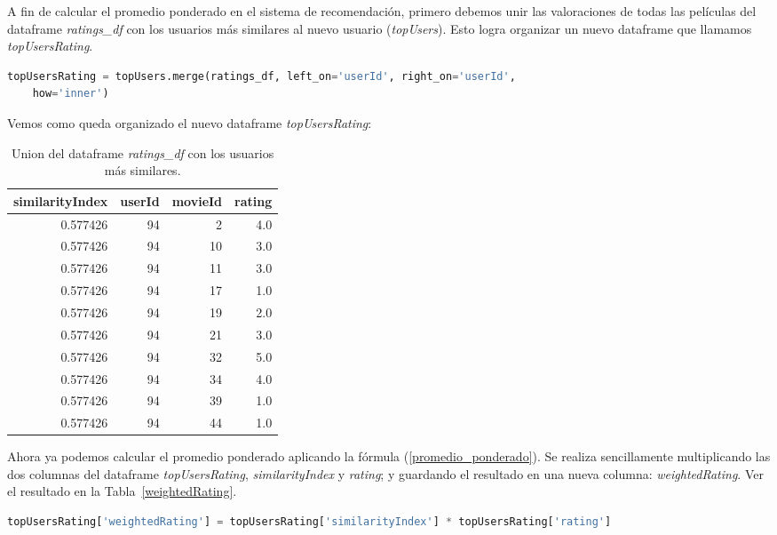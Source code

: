 \documentclass{uimppracticas}
\begin{document}
A fin de calcular el promedio ponderado en el sistema de recomendación, primero debemos unir las valoraciones de todas las películas del dataframe \textit{ratings\_df} con los usuarios más similares al nuevo usuario (\textit{topUsers}). Esto logra organizar un nuevo dataframe que llamamos \textit{topUsersRating}.

\begin{lstlisting}[language=python, basicstyle=\small]
topUsersRating = topUsers.merge(ratings_df, left_on='userId', right_on='userId', 
	how='inner')
\end{lstlisting}

Vemos como queda organizado el nuevo dataframe  \textit{topUsersRating}:

\begin{table}[H]
	\centering
	\begin{tabular}{rrrr}
		\toprule
		similarityIndex &  userId &  movieId &  rating \\
		\midrule
		0.577426 &      94 &        2 &     4.0 \\
		0.577426 &      94 &       10 &     3.0 \\
		0.577426 &      94 &       11 &     3.0 \\
		0.577426 &      94 &       17 &     1.0 \\
		0.577426 &      94 &       19 &     2.0 \\
		0.577426 &      94 &       21 &     3.0 \\
		0.577426 &      94 &       32 &     5.0 \\
		0.577426 &      94 &       34 &     4.0 \\
		0.577426 &      94 &       39 &     1.0 \\
		0.577426 &      94 &       44 &     1.0 \\
		\bottomrule
	\end{tabular}
	\caption{Union del dataframe \textit{ratings\_df} con los usuarios más similares.}
	\label{ratings_similares}
\end{table}

Ahora ya podemos calcular el promedio ponderado aplicando la fórmula (\ref{promedio_ponderado}). Se realiza sencillamente multiplicando las dos columnas del dataframe \textit{topUsersRating}, \textit{similarityIndex} y \textit{rating}; y guardando el resultado en una nueva columna: \textit{weightedRating}. Ver el resultado en la Tabla~\ref{weightedRating}.

\begin{lstlisting}[language=python, basicstyle=\small]
topUsersRating['weightedRating'] = topUsersRating['similarityIndex'] * topUsersRating['rating']
\end{lstlisting} 
\end{document}
